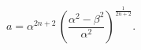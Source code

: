 \begin{equation}
a=\alpha^{2n+2}\,\left ({\frac {\alpha^2-\beta^2}{{\alpha}^{2}}}\right )^\frac{1}{2n+2}.
\end{equation}

